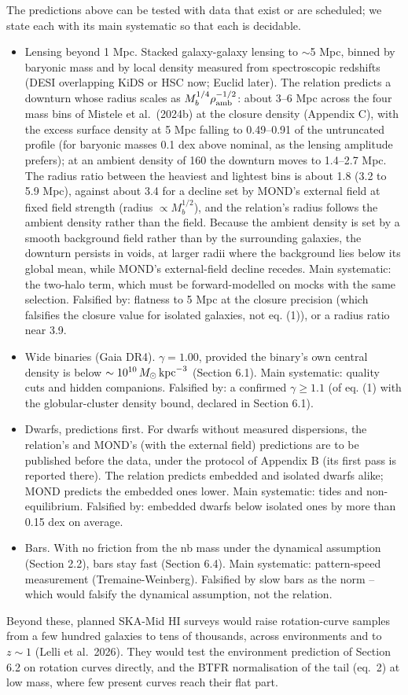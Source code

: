 \documentclass[
  10pt,
]{article}
\begin{document}
The predictions above can be tested with data that exist or are scheduled; we state each with its main systematic so that each is decidable.
\begin{itemize}
\item[(i)] Lensing beyond 1 Mpc. Stacked galaxy-galaxy lensing to $\sim$5 Mpc, binned by baryonic mass and by local density measured from spectroscopic redshifts (DESI overlapping KiDS or HSC now; Euclid later). The relation predicts a downturn whose radius scales as $M_b^{1/4}\rho_{\rm amb}^{-1/2}$: about 3--6 Mpc across the four mass bins of Mistele et al.~(2024b) at the closure density (Appendix C), with the excess surface density at 5 Mpc falling to 0.49--0.91 of the untruncated profile (for baryonic masses 0.1 dex above nominal, as the lensing amplitude prefers); at an ambient density of 160 the downturn moves to 1.4--2.7 Mpc. The radius ratio between the heaviest and lightest bins is about 1.8 (3.2 to 5.9 Mpc), against about 3.4 for a decline set by MOND's external field at fixed field strength (radius $\propto M_b^{1/2}$), and the relation's radius follows the ambient density rather than the field. Because the ambient density is set by a smooth background field rather than by the surrounding galaxies, the downturn persists in voids, at larger radii where the background lies below its global mean, while MOND's external-field decline recedes. Main systematic: the two-halo term, which must be forward-modelled on mocks with the same selection. Falsified by: flatness to 5 Mpc at the closure precision (which falsifies the closure value for isolated galaxies, not eq. (1)), or a radius ratio near 3.9.
\item[(ii)] Wide binaries (Gaia DR4). $\gamma=1.00$, provided the binary's own central density is below $\sim10^{10}\,M_\odot\,{\rm kpc}^{-3}$ (Section 6.1). Main systematic: quality cuts and hidden companions. Falsified by: a confirmed $\gamma\ge1.1$ (of eq. (1) with the globular-cluster density bound, declared in Section 6.1).
\item[(iii)] Dwarfs, predictions first. For dwarfs without measured dispersions, the relation's and MOND's (with the external field) predictions are to be published before the data, under the protocol of Appendix B (its first pass is reported there). The relation predicts embedded and isolated dwarfs alike; MOND predicts the embedded ones lower. Main systematic: tides and non-equilibrium. Falsified by: embedded dwarfs below isolated ones by more than 0.15 dex on average.
\item[(iv)] Bars. With no friction from the nb mass under the dynamical assumption (Section 2.2), bars stay fast (Section 6.4). Main systematic: pattern-speed measurement (Tremaine-Weinberg). Falsified by slow bars as the norm -- which would falsify the dynamical assumption, not the relation.
\end{itemize}
Beyond these, planned SKA-Mid HI surveys would raise rotation-curve samples from a few hundred galaxies to tens of thousands, across environments and to $z\sim1$ (Lelli et al.~2026). They would test the environment prediction of Section 6.2 on rotation curves directly, and the BTFR normalisation of the tail (eq.~2) at low mass, where few present curves reach their flat part.
\end{document}
